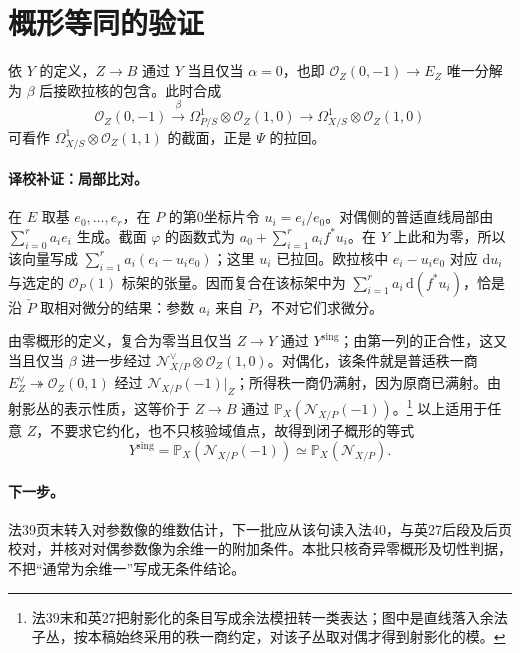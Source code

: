 \documentclass[openany,fontset=fandol]{ctexbook}
\newcommand{\PP}{\mathbb P}
\newcommand{\Ocal}{\mathcal O}
\newcommand{\N}{\mathcal N}
\newcommand{\Pdual}{\check P}
\newcommand{\Ysing}{Y^{\mathrm{sing}}}
\begin{document}
\newpage
\section*{概形等同的验证}
依 $Y$ 的定义，$Z\to B$ 通过 $Y$ 当且仅当 $\alpha=0$，也即 $\Ocal_Z(0,-1)\to E_Z$ 唯一分解为 $\beta$ 后接欧拉核的包含。此时合成
\[
 \Ocal_Z(0,-1)\xrightarrow{\beta}
 \Omega^1_{P/S}\otimes\Ocal_Z(1,0)
 \longrightarrow\Omega^1_{X/S}\otimes\Ocal_Z(1,0)
\]
可看作 $\Omega^1_{X/S}\otimes\Ocal_Z(1,1)$ 的截面，正是 $\Psi$ 的拉回。

\paragraph{译校补证：局部比对。}
在 $E$ 取基 $e_0,\ldots,e_r$，在 $P$ 的第0坐标片令 $u_i=e_i/e_0$。对偶侧的普适直线局部由 $\sum_{i=0}^r a_i e_i$ 生成。截面 $\varphi$ 的函数式为 $a_0+\sum_{i=1}^r a_i f^*u_i$。在 $Y$ 上此和为零，所以该向量写成 $\sum_{i=1}^r a_i(e_i-u_i e_0)$；这里 $u_i$ 已拉回。欧拉核中 $e_i-u_i e_0$ 对应 $\mathrm du_i$ 与选定的 $\Ocal_P(1)$ 标架的张量。因而复合在该标架中为 $\sum_{i=1}^r a_i\,\mathrm d(f^*u_i)$，恰是沿 $\Pdual$ 取相对微分的结果：参数 $a_i$ 来自 $\Pdual$，不对它们求微分。

由零概形的定义，复合为零当且仅当 $Z\to Y$ 通过 $\Ysing$；由第一列的正合性，这又当且仅当 $\beta$ 进一步经过 $\N^\vee_{X/P}\otimes\Ocal_Z(1,0)$。对偶化，该条件就是普适秩一商 $E_Z^\vee\twoheadrightarrow\Ocal_Z(0,1)$ 经过 $\N_{X/P}(-1)|_Z$；所得秩一商仍满射，因为原商已满射。由射影丛的表示性质，这等价于 $Z\to B$ 通过 $\PP_X(\N_{X/P}(-1))$。\footnote{法39末和英27把射影化的条目写成余法模扭转一类表达；图中是直线落入余法子丛，按本稿始终采用的秩一商约定，对该子丛取对偶才得到射影化的模。}
以上适用于任意 $Z$，不要求它约化，也不只核验域值点，故得到闭子概形的等式
\[
 \Ysing=\PP_X(\N_{X/P}(-1))\simeq\PP_X(\N_{X/P}).
\]

\paragraph{下一步。}
法39页末转入对参数像的维数估计，下一批应从该句读入法40，与英27后段及后页校对，并核对对偶参数像为余维一的附加条件。本批只核奇异零概形及切性判据，不把“通常为余维一”写成无条件结论。
\end{document}
